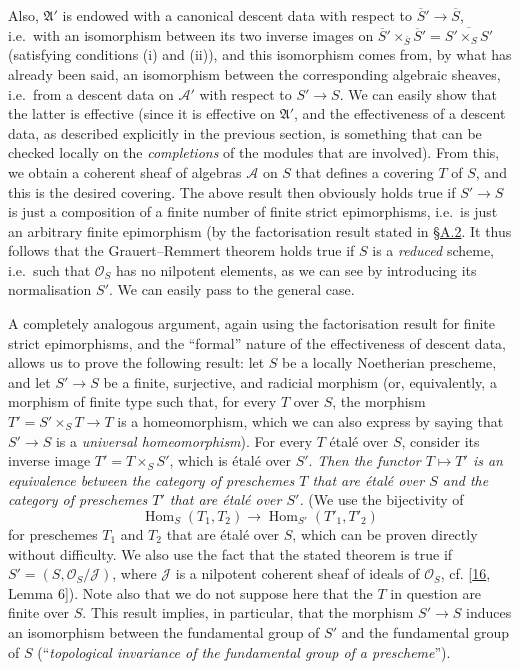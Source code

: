 \documentclass{article}
\newcommand{\oldpage}[1]{\marginpar{\footnotesize$\Big\vert$ \textit{p.~#1}}}
\theoremstyle{definition}
\theoremstyle{definition}
\theoremstyle{definition}
\theoremstyle{definition}
\theoremstyle{remark}
\begin{document}
Also, \({\mathfrak{A}}'\) is endowed with a canonical descent data with respect to \(\overline{S}'\to\overline{S}\), i.e.~with an isomorphism between its two inverse images on \(\overline{S}'\times_{\overline{S}}\overline{S}'=\overline{S'\times_SS'}\) (satisfying conditions (i) and (ii)), and this isomorphism comes from, by what has already been said, an isomorphism between the corresponding algebraic sheaves, i.e.~from a descent data on \({\mathscr{A}}'\) with respect to \(S'\to S\).
We can easily show that the latter is effective (since it is effective on \({\mathfrak{A}}'\), and the effectiveness of a descent data, as described explicitly in the previous section, is something that can be checked locally on the \emph{completions} of the modules that are involved).
From this, we obtain a coherent sheaf of algebras \({\mathscr{A}}\) on \(S\) that defines a covering \(T\) of \(S\), and this is the desired covering.
The above result then obviously holds true if \(S'\to S\) is just a composition of a finite number of finite strict epimorphisms, i.e.~is just an arbitrary finite epimorphism (by the factorisation result stated in \protect\hyperlink{fga-3-i-section-A.2}{§A.2}.
It thus follows that the Grauert--Remmert theorem holds true if \(S\) is a \emph{reduced} scheme, i.e.~such that \({\mathscr{O}}_S\) has no nilpotent elements, as we can see by introducing its normalisation \(S'\).
We can easily pass to the general case.

A completely analogous argument, again using the factorisation result for finite strict epimorphisms, and the ``formal'' nature of the effectiveness of descent data, allows us to prove the following result:
let \(S\) be a locally Noetherian prescheme, and let \(S'\to S\) be a finite, surjective, and radicial morphism (or, equivalently, a morphism of finite type such that, for every \(T\) over \(S\), the morphism \(T'=S'\times_S T\to T\) is a homeomorphism, which we can also express by saying that \(S'\to S\) is a \emph{universal homeomorphism}).
For every \(T\) étalé over \(S\), consider its inverse image \(T'=T\times_S S'\), which is étalé over \(S'\).
\emph{Then the functor \(T\mapsto T'\) is an equivalence between the category of preschemes \(T\) that are étalé over \(S\) and the category of preschemes \(T'\) that are étalé over \(S'\).}
(We use the bijectivity of
\[
  \operatorname{Hom}_S(T_1,T_2) \to \operatorname{Hom}_{S'}(T'_1,T'_2)
\]
for preschemes \(T_1\) and \(T_2\) that are étalé over \(S\), which can be proven directly without difficulty. We also use the fact that the stated theorem is true if \(S'=(S,{\mathscr{O}}_S/{\mathscr{J}})\), where \({\mathscr{J}}\) is a nilpotent coherent sheaf of ideals of \({\mathscr{O}}_S\), cf. {[}\protect\hyperlink{ref-Mur1958}{16}, Lemma 6{]}).
\oldpage{190-12}Note also that we do not suppose here that the \(T\) in question are finite over \(S\).
This result implies, in particular, that the morphism \(S'\to S\) induces an isomorphism between the fundamental group of \(S'\) and the fundamental group of \(S\) (``\emph{topological invariance of the fundamental group of a prescheme}'').
\end{document}
